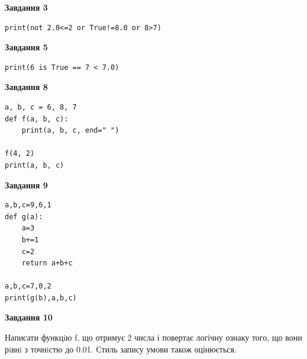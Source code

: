 \documentclass[12pt, ukrainian]{article}
\begin{document}
{\begin {large}
\begin{minipage}[t]{7.5cm}
\end{minipage}
\vline \hspace{6mm}
\begin{minipage}[t]{10.5cm}

\begin{center}
\textbf{Завдання 3}
\end{center}

\begin{verbatim}
print(not 2.0<=2 or True!=8.0 or 8>7)
\end{verbatim}



\begin{center}
\textbf{Завдання 5}
\end{center}

\begin{verbatim}
print(6 is True == 7 < 7.0)
\end{verbatim}



\begin{center}
\textbf{Завдання 8}
\end{center}

\begin{verbatim}
a, b, c = 6, 8, 7
def f(a, b, c):
    print(a, b, c, end=" ")

f(4, 2)
print(a, b, c)
\end{verbatim}



\begin{center}
\textbf{Завдання 9}
\end{center}

\begin{verbatim}
a,b,c=9,6,1
def g(a):
    a=3
    b+=1
    c=2
    return a+b+c

a,b,c=7,0,2
print(g(b),a,b,c)
\end{verbatim}



\begin{center}
\textbf{Завдання 10}
\end{center}

Написати функцiю f, що отримує 2 числа і повертає логічну ознаку того, що вони рiвнi з точнiстю до 0.01. Стиль запису умови також оцінюється.\par

\end{minipage}

\end {large}}
\newpage
\end{document}
